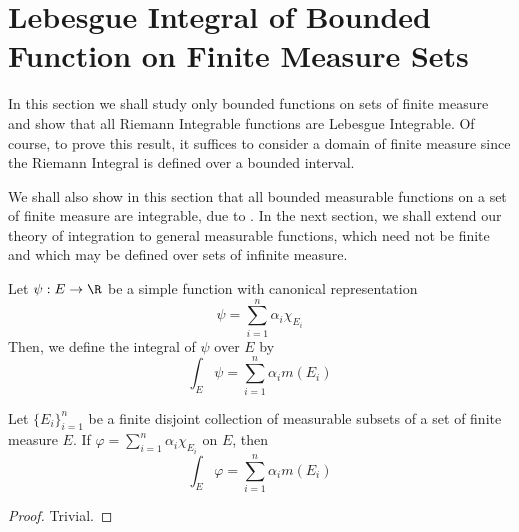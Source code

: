\section{Lebesgue Integral of Bounded Function on Finite Measure Sets}
In this section we shall study only bounded functions on sets of finite measure and show that all Riemann Integrable functions are Lebesgue Integrable. Of course, to prove this result, it suffices to consider a domain of finite measure since the Riemann Integral is defined over a bounded interval. 

We shall also show in this section that all bounded measurable functions on a set of finite measure are integrable, due to .
In the next section, we shall extend our theory of integration to general measurable functions, which need not be finite and which may be defined over sets of infinite measure.

\begin{definition}
    Let $\psi: E\to\R$ be a simple function with canonical representation 
    \begin{equation*}
        \psi = \sum_{i = 1}^n\alpha_i\chi_{E_i}
    \end{equation*}
    Then, we define the integral of $\psi$ over $E$ by 
    \begin{equation*}
        \int_E\psi = \sum_{i = 1}^n\alpha_i m(E_i)
    \end{equation*}
\end{definition}

\begin{proposition}
    Let $\{E_i\}_{i = 1}^n$ be a finite disjoint collection of measurable subsets of a set of finite measure $E$. If $\varphi = \sum_{i = 1}^n\alpha_i\chi_{E_i}$ on $E$, then 
    \begin{equation*}
        \int_{E}\varphi = \sum_{i = 1}^n\alpha_i m(E_i)
    \end{equation*}
\end{proposition}
\begin{proof}
    Trivial.
\end{proof}

